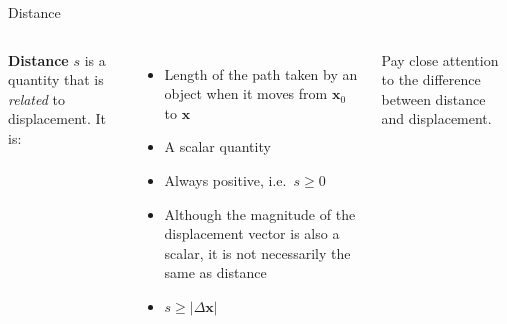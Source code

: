\documentclass[12pt,compress,aspectratio=169]{beamer}
\begin{document}
\begin{frame}{Distance}
  \begin{columns}
    \textbf{Distance} $s$ is a quantity that is \emph{related} to displacement.
    It is:
    \begin{itemize}
    \item Length of the path taken by an object when it moves from
      $\bm{x}_0$ to $\bm{x}$
    \item A scalar quantity
    \item Always positive, i.e.\ $s\geq 0$
    \item Although the magnitude of the displacement vector is also a scalar,
      it is not necessarily the same as distance
    \item $s\geq |\Delta\bm{x}|$
    \end{itemize}
    Pay close attention to the difference between distance and displacement.
    
  \end{columns}
\end{frame}




%
%
%
%  
%  
%
\end{document}
